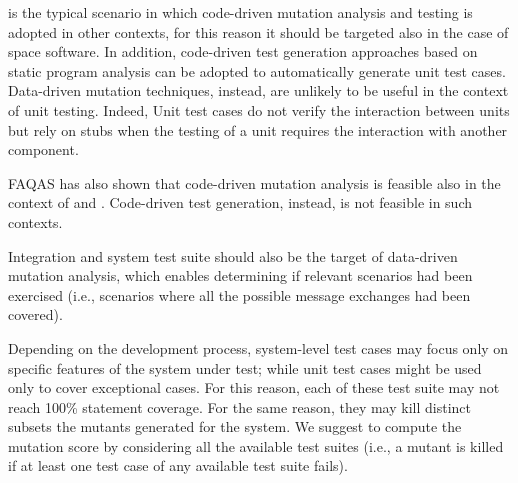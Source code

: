 
 is the typical scenario in which code-driven mutation analysis and testing is adopted in other contexts, for this reason it should be targeted also in the case of space software.
In addition, code-driven test generation approaches based on static program analysis can be adopted to automatically generate unit test cases.
Data-driven mutation techniques, instead, are unlikely to be useful in the context of unit testing.
Indeed, Unit test cases do not verify the interaction between units but rely on stubs when the testing of a unit requires the interaction with another component.

FAQAS has also shown that code-driven mutation analysis is feasible also in the context of  and . Code-driven test generation, instead, is not feasible in such contexts.

Integration and system test suite should also be the target of data-driven mutation analysis, which enables determining if relevant scenarios had been exercised (i.e., scenarios where all the possible message exchanges had been covered). 


Depending on the development process, system-level test cases may focus only on specific features of the system under test; while unit test cases might be used only to cover exceptional cases. For this reason, each of these test suite may not reach 100\% statement coverage. For the same reason, they may kill distinct subsets the mutants generated for the system. 
We suggest to compute the mutation score by considering all the available test suites (i.e., a mutant is killed if at least one test case of any available test suite fails).

